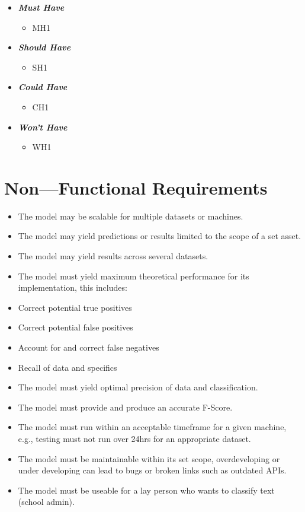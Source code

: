\begin{itemize}
    \item \textbf{\textit{Must Have}}
        \begin{itemize}\label{FMH}
            \item MH1
        \end{itemize}
    \item \textbf{\textit{Should Have}}
        \begin{itemize}\label{FSH}
            \item SH1
        \end{itemize}
    \item \textbf{\textit{Could Have}}
        \begin{itemize}\label{FCH}
            \item CH1
        \end{itemize}
    \item \textbf{\textit{Won't Have}}
        \begin{itemize}\label{FWH}
            \item WH1
        \end{itemize}
\end{itemize}

\section{Non---Functional Requirements} \label{section:NonFunctionalRequirements}

\begin{itemize}
    \item The model may be scalable for multiple datasets or machines.
    \item The model may yield predictions or results limited to the scope of a set asset.
    \item The model may yield results across several datasets.
    \item The model must yield maximum theoretical performance for its implementation, this includes:
    \item Correct potential true positives
    \item Correct potential false positives
    \item Account for and correct false negatives
    \item Recall of data and specifics
    \item The model must yield optimal precision of data and classification.
    \item The model must provide and produce an accurate F-Score.
    \item The model must run within an acceptable timeframe for a given machine, e.g., testing must not run over 24hrs for an appropriate dataset.
    \item The model must be maintainable within its set scope, overdeveloping or under developing can lead to bugs or broken links such as outdated APIs.
    \item The model must be useable for a lay person who wants to classify text (school admin).
\end{itemize}

